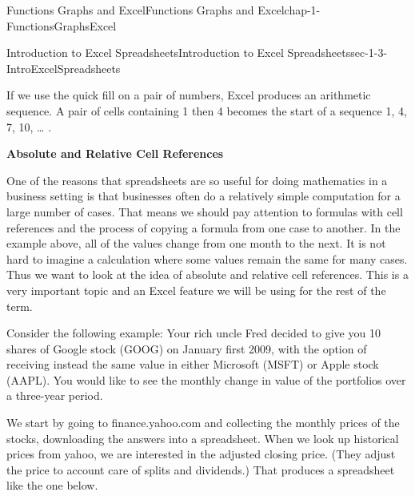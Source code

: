 \documentclass[oneside,10pt,]{book}
\newcommand{\terminology}[1]{\textbf{#1}}
\numberwithin{equation}{section}
\begin{document}
\begin{chapterptx}{Functions Graphs and Excel}{}{Functions Graphs and Excel}{}{}{chap-1-FunctionsGraphsExcel}
\begin{sectionptx}{Introduction to Excel Spreadsheets}{}{Introduction to Excel Spreadsheets}{}{}{sec-1-3-IntroExcelSpreadsheets}
\par
\hypertarget{p-246}{}%
If we use the quick fill on a pair of numbers, Excel produces an arithmetic sequence.  A pair of cells containing 1 then 4 becomes the start of a sequence 1, 4, 7, 10,  … .%
\par
\hypertarget{p-247}{}%
\terminology{Absolute and Relative Cell References}%
\par
\hypertarget{p-248}{}%
One of the reasons that spreadsheets are so useful for doing mathematics in a business setting is that businesses often do a relatively simple computation for a large number of cases.  That means we should pay attention to formulas with cell references and the process of copying a formula from one case to another.  In the example above, all of the values change from one month to the next.  It is not hard to imagine a calculation where some values remain the same for many cases.  Thus we want to look at the idea of absolute and relative cell references.  This is a very important topic and an Excel feature we will be using for the rest of the term.%
\par
\hypertarget{p-249}{}%
Consider the following example: Your rich uncle Fred decided to give you 10 shares of Google stock (GOOG) on January first 2009, with the option of receiving instead the same value in either Microsoft (MSFT) or Apple stock (AAPL). You would like to see the monthly change in value of the portfolios over a three-year period.%
\par
\hypertarget{p-250}{}%
We start by going to finance.yahoo.com and collecting the monthly prices of the stocks, downloading the answers into a spreadsheet.  When we look up historical prices from yahoo, we are interested in the adjusted closing price.  (They adjust the price to account care of splits and dividends.)  That produces a spreadsheet like the one below.%
\begin{sidebyside}{1}{0.1}{0.1}{0}%
\begin{sbspanel}{0.8}%

\end{sbspanel}
\end{sidebyside}
\end{sectionptx}
\end{chapterptx}
\end{document}
